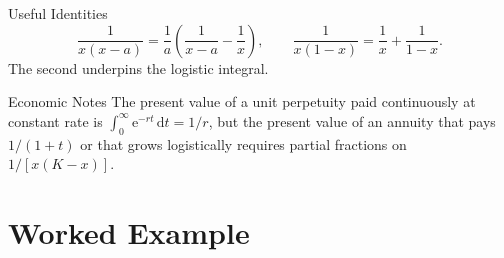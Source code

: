 \begin{rulebox}{Useful Identities}
\[
  \frac{1}{x(x-a)} = \frac1a\left(\frac{1}{x-a}-\frac1x\right), \qquad
  \frac{1}{x(1-x)} = \frac1x+\frac{1}{1-x} .
\]
The second underpins the logistic integral.
\end{rulebox}

\begin{rulebox}{Economic Notes}
The present value of a unit perpetuity paid continuously at constant
rate is $\int_{0}^{\infty}\mathrm{e}^{-rt}\,\mathrm{d}t=1/r$, but the
present value of an annuity that pays $1/(1+t)$ or that grows
logistically requires partial fractions on $1/[x(K-x)]$.
\end{rulebox}

\section{Worked Example}

